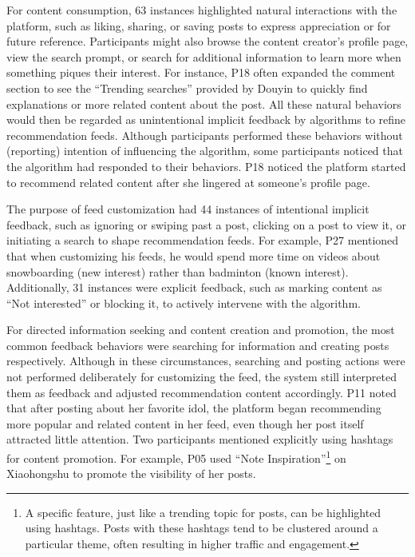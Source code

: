 For content consumption, 63 instances highlighted natural interactions with the platform, such as liking, sharing, or saving posts to express appreciation or for future reference. Participants might also browse the content creator's profile page, view the search prompt, or search for additional information to learn more when something piques their interest. For instance, P18 often expanded the comment section to see the ``Trending searches'' provided by Douyin to quickly find explanations or more related content about the post. All these natural behaviors would then be regarded as unintentional implicit feedback by algorithms to refine recommendation feeds. Although participants performed these behaviors without (reporting) intention of influencing the algorithm, some participants noticed that the algorithm had responded to their behaviors. P18 noticed the platform started to recommend related content after she lingered at someone's profile page.


The purpose of feed customization had 44 instances of intentional implicit feedback, such as ignoring or swiping past a post, clicking on a post to view it, or initiating a search to shape recommendation feeds. For example, P27 mentioned that when customizing his feeds, he would spend more time on videos about snowboarding (new interest) rather than badminton (known interest). Additionally, 31 instances were explicit feedback, such as marking content as ``Not interested'' or blocking it, to actively intervene with the algorithm. %

For directed information seeking and content creation and promotion, the most common feedback behaviors were searching for information and creating posts respectively. Although in these circumstances, searching and posting actions were not performed deliberately for customizing the feed, the system still interpreted them as feedback and adjusted recommendation content accordingly. P11 noted that after posting about her favorite idol, the platform began recommending more popular and related content in her feed, even though her post itself attracted little attention. Two participants mentioned explicitly using hashtags for content promotion. For example, P05 used ``Note Inspiration''\footnote{A specific feature, just like a trending topic for posts, can be highlighted using hashtags. Posts with these hashtags tend to be clustered around a particular theme, often resulting in higher traffic and engagement.} on Xiaohongshu to promote the visibility of her posts.


